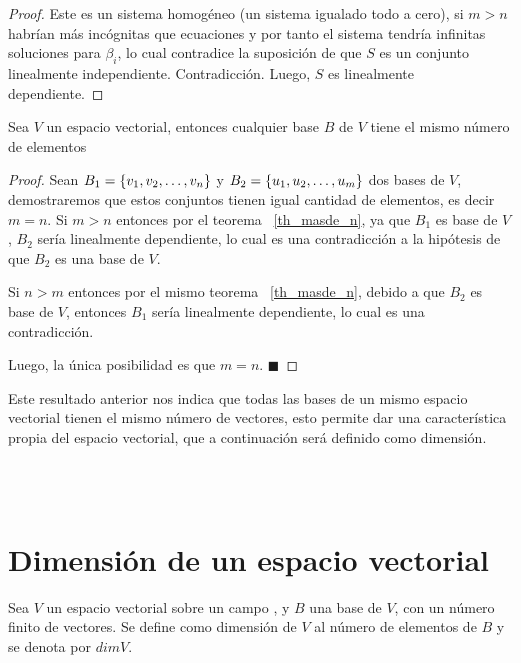 \begin{proof}
Este es un sistema homogéneo (un sistema igualado todo a cero), si $m>n$ habrían más incógnitas que ecuaciones y por tanto el sistema tendría infinitas soluciones para $\beta_i$, lo cual contradice la suposición de que $S$ es un conjunto linealmente independiente. Contradicción. Luego, $S$ es linealmente dependiente.

\end{proof}

\begin{theorem}
Sea $V$ un espacio vectorial, entonces cualquier base $B$ de $V$ tiene el mismo número de elementos
\end{theorem}

\begin{proof}
Sean $B_1= \lbrace v_1, v_2, \ldots, v_n \rbrace$ y $B_2= \lbrace u_1, u_2, \ldots, u_m \rbrace$ dos bases de $V$, demostraremos que estos conjuntos tienen igual cantidad de elementos, es decir $m=n$.
Si $m>n$ entonces por el teorema ~\ref{th_masde_n}, ya que $B_1$ es base de $V$, $B_2$ ser\'ia linealmente dependiente, lo cual es una contradicción a la hipótesis de que $B_2$ es una base de $V$.

Si $n>m$ entonces por el mismo teorema ~\ref{th_masde_n}, debido a que $B_2$ es base de $V$, entonces $B_1$ ser\'ia linealmente dependiente, lo cual es una contradicción.

Luego, la única posibilidad es que $m=n$. $\blacksquare$
\end{proof}

Este resultado anterior nos indica que todas las bases de un mismo espacio vectorial tienen el mismo número de vectores, esto permite dar una caracter\'istica propia del espacio vectorial, que a continuación ser\'a definido como dimensión.

~\\
~\\
\newpage
\section{Dimensión de un espacio vectorial}
\begin{dfn}[Dimensión]
Sea $V$ un espacio vectorial sobre un campo \doblek, y $B$ una base de $V$, con un número finito de vectores. Se define como dimensión de $V$ al número de elementos de $B$ y se denota por $dimV$.
~\\
\end{dfn}

